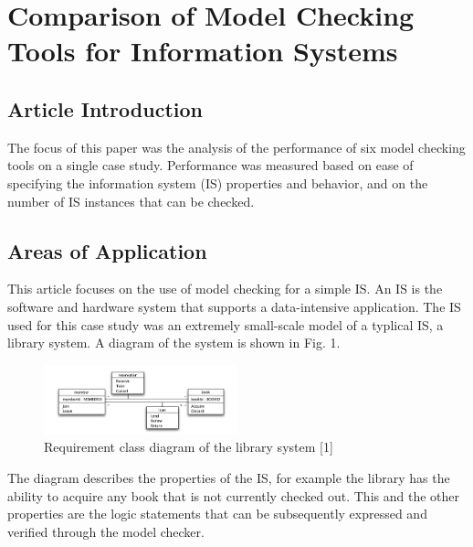 \documentclass[conference]{IEEEtran}
\begin{document}
\section{Comparison of Model Checking Tools for Information Systems}

\subsection{Article Introduction}
The focus of this paper was the analysis of the performance of six model checking tools on a single case study. Performance was measured based on ease of specifying the information system (IS) properties and behavior, and on the number of IS instances that can be checked. 

\subsection{Areas of Application}
This article focuses on the use of model checking for a simple IS. An IS is the software and hardware system that supports a data-intensive application. The IS used for this case study was an extremely small-scale model of a typlical IS, a library system. A diagram of the system is shown in Fig. 1.

\begin{figure}[htbp]
\centerline{\includegraphics[width=0.5\textwidth]{./images/case_study.png}}
\caption{Requirement class diagram of the library system [1]}
\label{fig}
\end{figure}

The diagram describes the properties of the IS, for example the library has the ability to acquire any book that is not currently checked out. This and the other properties are the logic statements that can be subsequently expressed and verified through the model checker.
\end{document}
